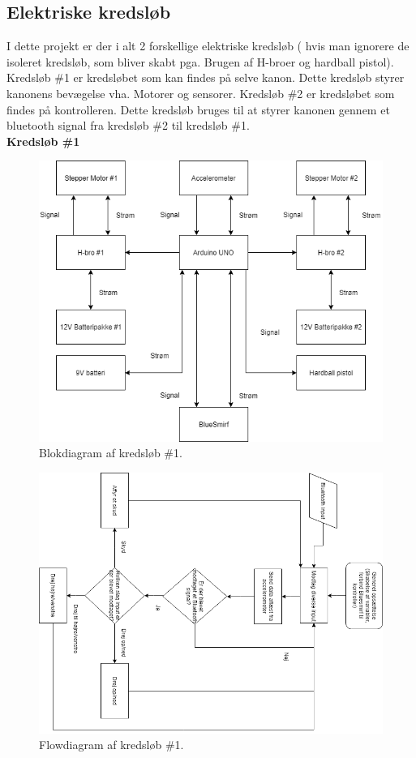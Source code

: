 \subsection{Elektriske kredsløb}
I dette projekt er der i alt 2 forskellige elektriske kredsløb ( hvis man ignorere de isoleret kredsløb, som bliver skabt pga. Brugen af H-broer og hardball pistol). Kredsløb \#1 er kredsløbet som kan findes på selve kanon. Dette kredsløb styrer kanonens bevægelse vha. Motorer og sensorer. Kredsløb \#2 er kredsløbet som findes på kontrolleren. Dette kredsløb bruges til at styrer kanonen gennem et bluetooth signal fra kredsløb \#2 til kredsløb \#1. \\

\textbf{{\normalsize Kredsløb \#1}}

\begin{figure}[H]
\centering
\includegraphics[scale=0.8]{Billeder/Kredsloeb1.png}
\caption{Blokdiagram af kredsløb \#1.}
\label{fig:Blokdiagram1}
\end{figure}


\begin{figure}[H]
\centering
\includegraphics[scale=0.8, angle = 90]{Billeder/Flowchart1.png}
\caption{Flowdiagram af kredsløb \#1.}
\label{fig:Flowdiagram1}
\end{figure}

